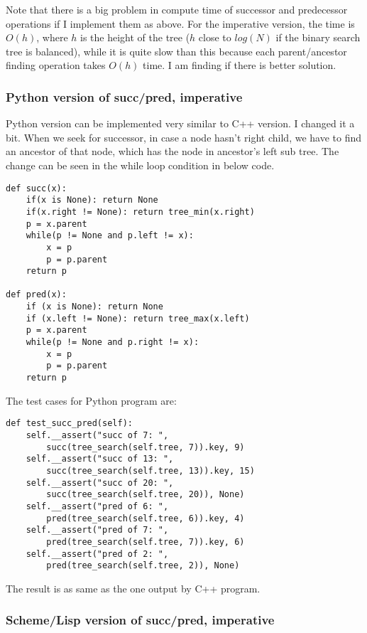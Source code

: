 \documentclass{article}
\begin{document}
Note that there is a big problem in compute time of successor and predecessor 
operations if I implement them as above. For the imperative version, the time
is $O(h)$, where $h$ is the height of the tree ($h$ close to $log(N)$ if the
binary search tree is balanced), while it is quite slow than this because each
parent/ancestor finding operation takes $O(h)$ time. I am finding if there is 
better solution.

\subsubsection*{Python version of succ/pred, imperative}

Python version can be implemented very similar to C++ version. I changed it
a bit. When we seek for successor, in case a node hasn't right child, we have to find an ancestor of that
node, which has the node in ancestor's left sub tree. The change can be seen
in the while loop condition in below code.

\lstset{language=Python}
\begin{lstlisting}
def succ(x):
    if(x is None): return None
    if(x.right != None): return tree_min(x.right)
    p = x.parent
    while(p != None and p.left != x):
        x = p
        p = p.parent
    return p

def pred(x):
    if (x is None): return None
    if (x.left != None): return tree_max(x.left)
    p = x.parent
    while(p != None and p.right != x):
        x = p
        p = p.parent
    return p
\end{lstlisting}

The test cases for Python program are:
\begin{lstlisting}
def test_succ_pred(self):
    self.__assert("succ of 7: ", 
        succ(tree_search(self.tree, 7)).key, 9)
    self.__assert("succ of 13: ", 
        succ(tree_search(self.tree, 13)).key, 15)
    self.__assert("succ of 20: ", 
        succ(tree_search(self.tree, 20)), None)
    self.__assert("pred of 6: ", 
        pred(tree_search(self.tree, 6)).key, 4)
    self.__assert("pred of 7: ", 
        pred(tree_search(self.tree, 7)).key, 6)
    self.__assert("pred of 2: ", 
        pred(tree_search(self.tree, 2)), None)
\end{lstlisting}

The result is as same as the one output by C++ program.

\subsubsection*{Scheme/Lisp version of succ/pred, imperative}
\end{document}
